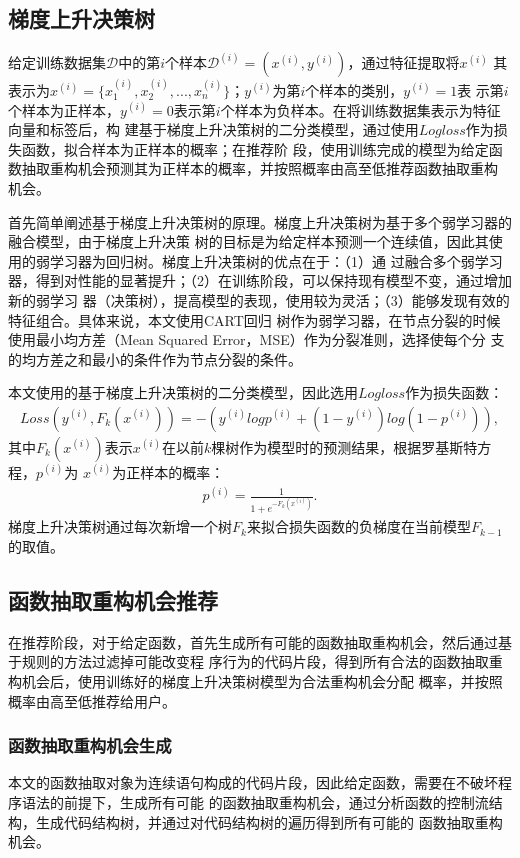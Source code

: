 \subsection{梯度上升决策树}
给定训练数据集$\mathcal D$中的第$i$个样本${\mathcal D}^{(i)}=(x^{(i)},y^{(i)})$，通过特征提取将$x^{(i)}$
其表示为$x^{(i)}=\{x_1^{(i)},x_2^{(i)},...,x_n^{(i)}\}$；$y^{(i)}$为第$i$个样本的类别，$y^{(i)}=1$表
示第$i$个样本为正样本，$y^{(i)}=0$表示第$i$个样本为负样本。在将训练数据集表示为特征向量和标签后，构
建基于梯度上升决策树的二分类模型，通过使用$Logloss$作为损失函数，拟合样本为正样本的概率；在推荐阶
段，使用训练完成的模型为给定函数抽取重构机会预测其为正样本的概率，并按照概率由高至低推荐函数抽取重构
机会。

首先简单阐述基于梯度上升决策树的原理。梯度上升决策树为基于多个弱学习器的融合模型，由于梯度上升决策
树的目标是为给定样本预测一个连续值，因此其使用的弱学习器为回归树。梯度上升决策树的优点在于：（1）通
过融合多个弱学习器，得到对性能的显著提升；（2）在训练阶段，可以保持现有模型不变，通过增加新的弱学习
器（决策树），提高模型的表现，使用较为灵活；（3）能够发现有效的特征组合。具体来说，本文使用CART回归
树作为弱学习器，在节点分裂的时候使用最小均方差（Mean Squared Error，MSE）作为分裂准则，选择使每个分
支的均方差之和最小的条件作为节点分裂的条件。

本文使用的基于梯度上升决策树的二分类模型，因此选用$Logloss$作为损失函数：
\begin{eqnarray}
  Loss(y^{(i)},F_k(x^{(i)})) = -(y^{(i)}logp^{(i)} + (1-y^{(i)})log(1-p^{(i)})),
\end{eqnarray}\label{logloss}
其中$F_k(x^{(i)})$表示$x^{(i)}$在以前$k$棵树作为模型时的预测结果，根据罗基斯特方程，$p^{(i)}$为
$x^{(i)}$为正样本的概率：
\begin{eqnarray}
  p^{(i)} = \frac{1}{1 + e^{-F_k(x^{(i)})}}.
\end{eqnarray}
梯度上升决策树通过每次新增一个树$F_k$来拟合损失函数的负梯度在当前模型$F_{k-1}$的取值。

\subsection{函数抽取重构机会推荐}
在推荐阶段，对于给定函数，首先生成所有可能的函数抽取重构机会，然后通过基于规则的方法过滤掉可能改变程
序行为的代码片段，得到所有合法的函数抽取重构机会后，使用训练好的梯度上升决策树模型为合法重构机会分配
概率，并按照概率由高至低推荐给用户。

\subsubsection{函数抽取重构机会生成}
本文的函数抽取对象为连续语句构成的代码片段，因此给定函数，需要在不破坏程序语法的前提下，生成所有可能
的函数抽取重构机会，通过分析函数的控制流结构，生成代码结构树，并通过对代码结构树的遍历得到所有可能的
函数抽取重构机会。

